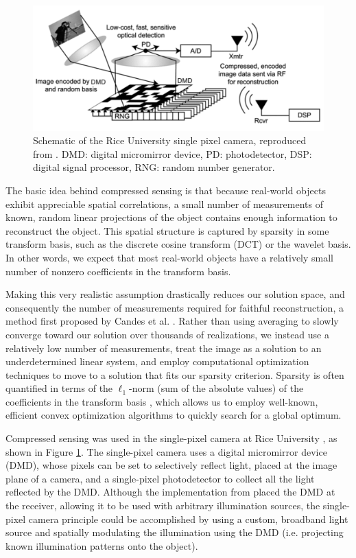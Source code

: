 \begin{figure}[t]
\begin{center}
\includegraphics[width=14cm]{figure-ghost-cscam.pdf}
\caption{Schematic of the Rice University single pixel camera, reproduced from \cite{takhar-new}. DMD: digital micromirror device, PD: photodetector, DSP: digital signal processor, RNG: random number generator.}
\label{figure:ghost-cscam}
\end{center}
\end{figure}

The basic idea behind compressed sensing is that because real-world objects exhibit appreciable spatial correlations, a small number of measurements of known, random linear projections of the object contains enough information to reconstruct the object. This spatial structure is captured by sparsity in some transform basis, such as the discrete cosine transform (DCT) or the wavelet basis. In other words, we expect that most real-world objects have a relatively small number of nonzero coefficients in the transform basis.

Making this very realistic assumption drastically reduces our solution space, and consequently the number of measurements required for faithful reconstruction, a method first proposed by Candes et al. \cite{candes-stable}. Rather than using averaging to slowly converge toward our solution over thousands of realizations, we instead use a relatively low number of measurements, treat the image as a solution to an underdetermined linear system, and employ computational optimization techniques to move to a solution that fits our sparsity criterion. Sparsity is often quantified in terms of the $\ell_1$-norm (sum of the absolute values) of the coefficients in the transform basis \cite{candes-stable}, which allows us to employ well-known, efficient convex optimization algorithms to quickly search for a global optimum.

Compressed sensing was used in the single-pixel camera at Rice University \cite{duarte-single}, as shown in Figure \ref{figure:ghost-cscam}. The single-pixel camera uses a digital micromirror device (DMD), whose pixels can be set to selectively reflect light, placed at the image plane of a camera, and a single-pixel photodetector to collect all the light reflected by the DMD. Although the implementation from \cite{duarte-single} placed the DMD at the receiver, allowing it to be used with arbitrary illumination sources, the single-pixel camera principle could be accomplished by using a custom, broadband light source and spatially modulating the illumination using the DMD (i.e. projecting known illumination patterns onto the object).

